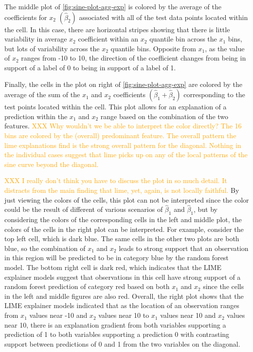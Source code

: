 \documentclass[AMS,STIX2COL]{WileyNJD-v2}\usepackage[]{graphicx}\usepackage[]{color}
\newcommand{\hh}[1]{\textcolor{orange}{#1}}
\begin{document}
{The middle plot of \autoref{fig:sine-plot-agg-exp} is colored by the average of the coefficients for $x_2$ $\left(\hat{\beta}_2\right)$ associated with all of the test data points located within the cell. In this case, there are horizontal stripes showing that there is little variability in average $x_2$ coefficient within an $x_2$ quantile bin across the $x_1$ bins, but lots of variability across the $x_2$ quantile bins. Opposite from $x_1$, as the value of $x_2$ ranges from -10 to 10, the direction of the coefficient changes from being in support of a label of 0 to being in support of a label of 1.

Finally, the cells in the plot on right of \autoref{fig:sine-plot-agg-exp} are colored by the average of the sum of the $x_1$ and $x_2$ coefficients $\left(\hat{\beta}_1+\hat{\beta}_2\right)$ corresponding to the test points located within the cell. This plot allows for an explanation of a prediction within the $x_1$ and $x_2$ range based on the combination of the two features.
\hh{XXX Why wouldn't we be able to interpret the color directly? The 16 bins are colored by the (overall) predominant feature. The overall pattern the lime explanations find is the strong overall pattern for the diagonal. Nothing in the individual cases suggest that lime picks up on any of the local patterns of the sine curve beyond the diagonal. }

\hh{XXX I really don't think you have to discuss the plot in so much detail. It distracts from the main finding that lime, yet, again, is not locally faithful.}
By just viewing the colors of the cells, this plot can not be interpreted since the color could be the result of different of various scenarios of $\hat{\beta}_1$ and $\hat{\beta}_1$, but by considering the colors of the corresponding cells in the left and middle plot, the colors of the cells in the right plot can be interpreted. For example, consider the top left cell, which is dark blue. The same cells in the other two plots are both blue, so the combination of $x_1$ and $x_2$ leads to strong support that an observation in this region will be predicted to be in category blue by the random forest model. The bottom right cell is dark red, which indicates that the LIME explainer models suggest that observations in this cell have strong support of a random forest prediction of category red based on both $x_1$ and $x_2$ since the cells in the left and middle figures are also red. Overall, the right plot shows that the LIME explainer models indicated that as the location of an observation ranges from $x_1$ values near -10 and $x_2$ values near 10 to $x_1$ values near 10 and $x_2$ values near 10, there is an explanation gradient from both variables supporting a prediction of 1 to both variables supporting a prediction 0 with contrasting support between predictions of 0 and 1 from the two variables on the diagonal.

}
\end{document}
